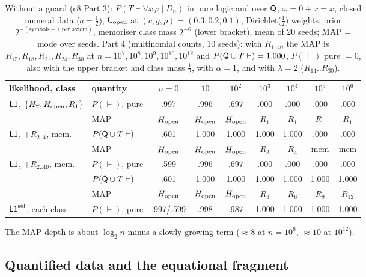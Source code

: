 \begin{table}[ht]
\centering\small
\setlength{\tabcolsep}{4.5pt}
\begin{tabular}{@{}llccccccc@{}}
\toprule
likelihood, class & quantity & $n=0$ & $10$ & $10^2$ & $10^3$ & $10^4$ & $10^5$ & $10^6$\\
\midrule
$\mathord{\mathsf{L1}}$, $\{H_{\forall},H_{\mathrm{open}},R_1\}$ & $P(\vdash)$, pure & .997 & .996 & .697 & .000 & .000 & .000 & .000\\
 & MAP & $H_{\mathrm{open}}$ & $H_{\mathrm{open}}$ & $H_{\mathrm{open}}$ & $R_1$ & $R_1$ & $R_1$ & $R_1$\\
$\mathord{\mathsf{L1}}$, $+R_{2..4}$, mem. & $P(\mathsf{Q}\cup T\vdash)$ & .601 & 1.000 & 1.000 & 1.000 & 1.000 & .000 & .000\\
 & MAP & $H_{\mathrm{open}}$ & $H_{\mathrm{open}}$ & $H_{\mathrm{open}}$ & $R_3$ & $R_4$ & mem & mem\\
$\mathord{\mathsf{L1}}$, $+R_{2..40}$, mem. & $P(\vdash)$, pure & .599 & .996 & .697 & .000 & .000 & .000 & .000\\
 & $P(\mathsf{Q}\cup T\vdash)$ & .601 & 1.000 & 1.000 & 1.000 & 1.000 & 1.000 & 1.000\\
 & MAP & $H_{\mathrm{open}}$ & $H_{\mathrm{open}}$ & $H_{\mathrm{open}}$ & $R_3$ & $R_6$ & $R_9$ & $R_{12}$\\
$\mathord{\mathsf{L1}}^{\mathrm{sel}}$, each class & $P(\vdash)$, pure & .997/.599 & .998 & .987 & 1.000 & 1.000 & 1.000 & 1.000\\
\bottomrule
\end{tabular}
\caption{Without a guard (c8 Part 3): $P(T\vdash\forall x\varphi\mid D_n)$ in pure logic and over $\mathsf{Q}$, $\varphi=0+x=x$, closed numeral data ($q=\tfrac12$), $\mathsf{C}_{\mathrm{open}}$ at $(c,g,\rho)=(0.3,0.2,0.1)$, Dirichlet($\tfrac12$) weights, prior $2^{-(\text{symbols}+1\text{ per axiom})}$, memoriser class mass $2^{-6}$ (lower bracket), mean of 20 seeds; MAP = mode over seeds. Part 4 (multinomial counts, 10 seeds): with $R_{1..40}$ the MAP is $R_{15},R_{18},R_{21},R_{24},R_{30}$ at $n=10^7,10^8,10^9,10^{10},10^{12}$ and $P(\mathsf{Q}\cup T\vdash)=1.000$, $P(\vdash)$ pure $=0$, also with the upper bracket and class mass $\tfrac12$, with $\alpha=1$, and with $\lambda=2$ ($R_{14}..R_{30}$).}
\label{tab:univ:noguard}
\end{table}

The MAP depth is about $\log_2n$ minus a slowly growing term ($\approx8$ at $n=10^6$, $\approx10$ at $10^{12}$).

\subsection{Quantified data and the equational fragment}\label{app:univ:quant}

